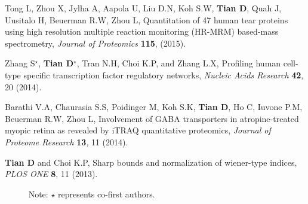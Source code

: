 \documentclass[paper=letter,fontsize=11pt]{scrartcl} %
\newcommand{\sepspace}{\vspace*{1em}}		%
\newcommand{\PaperEntry}[7]{
		\noindent #1, #2, \textit{#3} \textbf{#4}, #5 (#6).}
\newcommand{\ManEntry}[2]{
		\noindent #1, #2.}
\begin{document}
\begin{etaremune}
\item \PaperEntry{Tong L, Zhou X, Jylha A, Aapola U, Liu D.N, Koh S.W, \textbf{Tian D}, Quah J, Uusitalo H, Beuerman R.W, Zhou L}{Quantitation of 47 human tear proteins using high resolution multiple reaction monitoring (HR-MRM) based-mass spectrometry}{Journal of Proteomics}{115}{}{2015}{https://www.sciencedirect.com/science/article/pii/S1874391914005557}
\item \PaperEntry{Zhang S$^\star$, \textbf{Tian D}$^\star$,  Tran N.H, Choi K.P, and Zhang L.X}{Profiling human cell-type specific transcription factor regulatory networks}{Nucleic Acids Research}{42}{20}{2014}{https://academic.oup.com/nar/article/42/20/12380/2902979}  
\item \PaperEntry{Barathi V.A, Chaurasia S.S, Poidinger M, Koh S.K, \textbf{Tian D}, Ho C, Iuvone P.M, Beuerman R.W, Zhou L}{Involvement of GABA transporters in atropine-treated myopic retina as revealed by iTRAQ quantitative proteomics}{Journal of Proteome Research}{13}{11}{2014}{https://pubs.acs.org/doi/abs/10.1021/pr500558y}
\item \PaperEntry{\textbf{Tian D} and Choi K.P}{Sharp bounds and normalization of wiener-type indices}{PLOS ONE}{8}{11}{2013}{https://journals.plos.org/plosone/article?id=10.1371/journal.pone.0078448}
\end{etaremune}
~~~~~ Note: $\star$ represents co-first authors.
\end{document}
